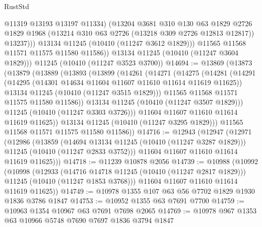 \begin{lexlean}{RustStd}
\begin{coremodule}
                  @11319
                  @13193
                  @13197
                  @11334)
                (@13204
                  @3681
                  @310
                  @130
                  @63
                  @1829
                  @2726
                  @1829
                  @1968
                  (@13214 @310 @63 @2726 (@13218 @309 @2726 @12813 @12817))
                  @13237)))
            @13134
            @11245
            (@10410 (@11247 @3612 @1829)))
          @11565
          @11568
          @11571
          @11575
          @11580
          @11586))
      @13134
      @11245
      (@10410 (@11247 @3604 @1829)))
    @11245
    (@10410 (@11247 @3523 @3700))
@14694 := @13869
    (@13873
      (@13879
        (@13889
          (@13893
            (@13899
              (@14261
                (@14271
                  (@14275
                    (@14281
                      (@14291
                        (@14295 (@14301 @14634 @11604 @11607 @11610 @11614 @11619 @11625))
                        @13134
                        @11245
                        (@10410 (@11247 @3515 @1829)))
                      @11565
                      @11568
                      @11571
                      @11575
                      @11580
                      @11586))
                  @13134
                  @11245
                  (@10410 (@11247 @3507 @1829)))
                @11245
                (@10410 (@11247 @3303 @3726)))
              @11604
              @11607
              @11610
              @11614
              @11619
              @11625))
          @13134
          @11245
          (@10410 (@11247 @3295 @1829)))
        @11565
        @11568
        @11571
        @11575
        @11580
        @11586))
@14716 := @12943
    (@12947
      (@12971
        (@12986
          (@13859
            (@14694 @13134 @11245 (@10410 (@11247 @3287 @1829)))
            @11245
            (@10410 (@11247 @2833 @3752)))
          @11604
          @11607
          @11610
          @11614
          @11619
          @11625)))
@14718 := @11239 @10878 @2056
@14739 := @10988
    (@10992
      (@10998
        (@12933
          (@14716 @14718 @11245 (@10410 (@11247 @2817 @1829)))
          @11245
          (@10410 (@11247 @1853 @3768)))
        @11604
        @11607
        @11610
        @11614
        @11619
        @11625))
@14749 := @10978 @1355 @107 @63 @56 @7702 @1829 @1930 @1836 @3786 @1847
@14753 := @10952 @1355 @63 @7691 @7700
@14759 := @10963 @1354 @10967 @63 @7691 @7698 @2065
@14769 := @10978 @967 @1353 @63 @10966 @5748 @7690 @7697 @1836 @3794 @1847

\end{coremodule}
\end{lexlean}
